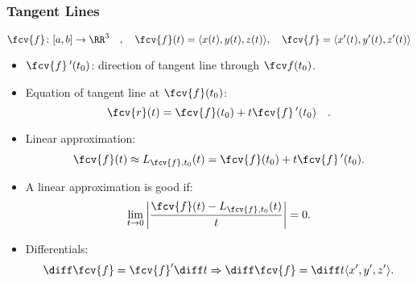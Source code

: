 \begin{frame}
\frametitle{Tangent Lines}
$$\fcv{f}\colon [a,b]\to \RR^3\quad , \quad \fcv{f}(t) = \langle x(t), y(t), z(t)\rangle, \quad \fcv{f}=\langle x'(t), y'(t), z'(t)\rangle $$
\begin{itemize}
\item $\fcv{f}\,'(t_0)$: direction of tangent line through $\fcv f(t_0)$.
\item<2-> Equation of tangent line at $\fcv{f}(t_0)$: 
\[
\fcv{r}(t) = \fcv{f}(t_0) + t \fcv{f}\,'(t_0) \quad .
\]
\item<3-> Linear approximation: 
\[
\fcv{f}(t) \approx L_{\fcv{f},t_0} (t) = \fcv{f}(t_0) + t \fcv{f}\,'(t_0).
\]
\item<4-> A linear approximation is good if:
\[
\lim_{t\to 0} \left|\frac{\fcv{f}(t) - L_{\fcv{f},t_0}(t)}{t} \right| =0.
\]
\item<5-> Differentials: 
\[
\diff \fcv{f} = \fcv{f}' \diff t \Rightarrow \diff \fcv{f} = \diff  t \langle x',y',z' \rangle .
\]
\end{itemize}
\end{frame}